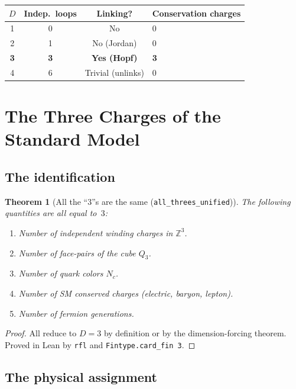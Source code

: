 \documentclass[11pt,a4paper]{article}
\theoremstyle{plain}
\newtheorem{theorem}{Theorem}[section]
\theoremstyle{definition}
\theoremstyle{remark}
\newcommand{\Z}{\mathbb{Z}}
\begin{document}
\begin{center}
\begin{tabular}{@{}cccl@{}}
\toprule
$D$ & Indep.\ loops & Linking? & Conservation charges \\
\midrule
1 & 0 & No & 0 \\
2 & 1 & No (Jordan) & 0 \\
\textbf{3} & \textbf{3} & \textbf{Yes (Hopf)} & \textbf{3} \\
4 & 6 & Trivial (unlinks) & 0 \\
\bottomrule
\end{tabular}
\end{center}

\section{The Three Charges of the Standard Model}
\label{sec:sm-charges}

\subsection{The identification}

\begin{theorem}[All the ``3''s are the same {\normalfont(\texttt{all\_threes\_unified})}]
\label{thm:all-threes}
The following quantities are all equal to~$3$:
\begin{enumerate}[nosep]
\item Number of independent winding charges in $\Z^3$.
\item Number of face-pairs of the cube $Q_3$.
\item Number of quark colors $N_c$.
\item Number of SM conserved charges (electric, baryon, lepton).
\item Number of fermion generations.
\end{enumerate}
\end{theorem}

\begin{proof}
All reduce to $D = 3$ by definition or by the dimension-forcing theorem.
Proved in Lean by \texttt{rfl} and \texttt{Fintype.card\_fin 3}.
\end{proof}

\subsection{The physical assignment}
\end{document}
